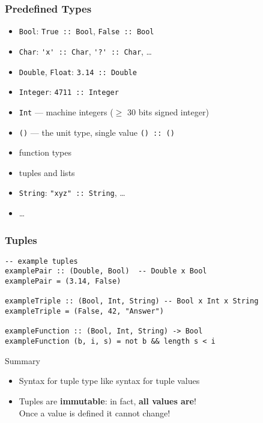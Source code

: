\documentclass{beamer}
\subtitle{Types}
\begin{document}
\begin{frame}
  \titlepage
\end{frame}
\begin{frame}[fragile]
  \frametitle{Predefined Types}
  \begin{itemize}
  \item \texttt{Bool}: \lstinline{True :: Bool}, \lstinline{False :: Bool}
  \item  \texttt{Char}: \lstinline{'x' :: Char}, \lstinline{'?' :: Char}, \dots
  \item \texttt{Double}, \texttt{Float}: \lstinline{3.14 :: Double}
  \item   \texttt{Integer}: \lstinline{4711 :: Integer}
  \item  \texttt{Int} --- machine integers ($\ge$ 30 bits signed
    integer)
  \item  \texttt{()}
    --- the unit type, single value \lstinline{() :: ()}
  \item  function types
  \item tuples and lists
  \item \texttt{String}:  \lstinline{"xyz" :: String}, \dots
  \item \dots
  \end{itemize}
\end{frame}
\begin{frame}[fragile]
  \frametitle{Tuples}
  \begin{block}{}
\begin{lstlisting}
-- example tuples
examplePair :: (Double, Bool)  -- Double x Bool
examplePair = (3.14, False)

exampleTriple :: (Bool, Int, String) -- Bool x Int x String
exampleTriple = (False, 42, "Answer")

exampleFunction :: (Bool, Int, String) -> Bool
exampleFunction (b, i, s) = not b && length s < i
\end{lstlisting}
  \end{block}
  \begin{alertblock}{Summary}
    \begin{itemize}
    \item Syntax for tuple type like syntax for tuple values
    \item Tuples are \textbf{immutable}: in fact, \textbf{all values
        are}!\\
      Once a value is defined it cannot change! 
    \end{itemize}
  \end{alertblock}
\end{frame}
\end{document}
